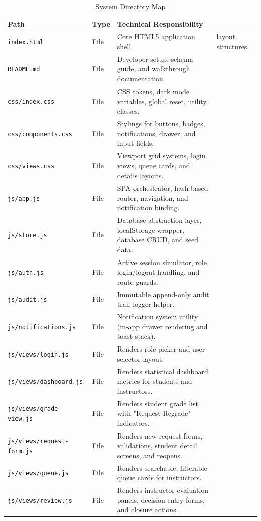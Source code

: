 \documentclass{article}
\begin{document}
\begin{longtable}{llp{7cm}}
\caption{System Directory Map} \\
\toprule
\textbf{Path} & \textbf{Type} & \textbf{Technical Responsibility} \\
\midrule
\endhead
\texttt{index.html} & File & Core HTML5 application shell & layout structures. \\
\texttt{README.md} & File & Developer setup, schema guide, and walkthrough documentation. \\
\texttt{css/index.css} & File & CSS tokens, dark mode variables, global reset, utility classes. \\
\texttt{css/components.css} & File & Stylings for buttons, badges, notifications, drawer, and input fields. \\
\texttt{css/views.css} & File & Viewport grid systems, login views, queue cards, and details layouts. \\
\texttt{js/app.js} & File & SPA orchestrator, hash-based router, navigation, and notification binding. \\
\texttt{js/store.js} & File & Database abstraction layer, localStorage wrapper, database CRUD, and seed data. \\
\texttt{js/auth.js} & File & Active session simulator, role login/logout handling, and route guards. \\
\texttt{js/audit.js} & File & Immutable append-only audit trail logger helper. \\
\texttt{js/notifications.js} & File & Notification system utility (in-app drawer rendering and toast stack). \\
\texttt{js/views/login.js} & File & Renders role picker and user selector layout. \\
\texttt{js/views/dashboard.js} & File & Renders statistical dashboard metrics for students and instructors. \\
\texttt{js/views/grade-view.js} & File & Renders student grade list with "Request Regrade" indicators. \\
\texttt{js/views/request-form.js} & File & Renders new request forms, validations, student detail screens, and reopens. \\
\texttt{js/views/queue.js} & File & Renders searchable, filterable queue cards for instructors. \\
\texttt{js/views/review.js} & File & Renders instructor evaluation panels, decision entry forms, and closure actions. \\
\bottomrule
\end{longtable}
\end{document}
